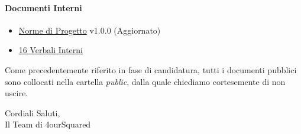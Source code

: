 \documentclass[12pt, a4paper]{article}
\begin{document}
\paragraph{Documenti Interni}
\begin{itemize}
    \item \href{https://github.com/4ourSquared/LumosMinima/tree/main/public/interni/norme_di_progetto_v1.0.0.pdf}{Norme di Progetto} v1.0.0 (Aggiornato)
    \item \href{https://github.com/4ourSquared/LumosMinima/tree/main/public/interni/verbali}{16 Verbali Interni}
\end{itemize}

Come precedentemente riferito in fase di candidatura, tutti i documenti pubblici sono collocati nella cartella \textit{public}, dalla quale chiediamo cortesemente di non uscire.

\begin{flushright}
    Cordiali Saluti,\\
    Il Team di 4ourSquared
    \end{flushright}
\end{document}
